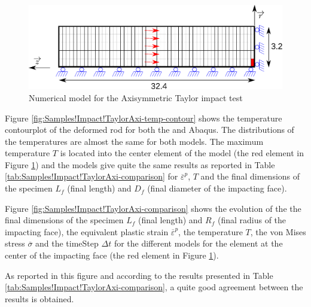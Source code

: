\begin{figure}[h]
\begin{centering}
\includegraphics[width=0.75\columnwidth]{Figures/TaylorAxi}
\par\end{centering}
\caption{Numerical model for the Axisymmetric Taylor impact test\label{fig:Samples!Impact!TaylorAxi}}
\end{figure}

Figure \ref{fig:Samples!Impact!TaylorAxi-temp-contour} shows the
temperature contourplot of the deformed rod for both the \DynELA and
Abaqus. The distributions of the temperatures are almost the same
for both models. The maximum temperature $T$ is located into the
center element of the model (the red element in Figure \ref{fig:Samples!Impact!TaylorAxi})
and the models give quite the same results as reported in Table \ref{tab:Samples!Impact!TaylorAxi-comparison}
for $\overline{\varepsilon}^{p}$, $T$ and the final dimensions of
the specimen $L_{f}$ (final length) and $D_{f}$ (final diameter
of the impacting face).

Figure \ref{fig:Samples!Impact!TaylorAxi-comparison} shows the evolution
of the the final dimensions of the specimen $L_{f}$ (final length)
and $R_{f}$ (final radius of the impacting face), the equivalent
plastic strain $\overline{\varepsilon}^{p}$, the temperature $T$,
the von Mises stress $\overline{\sigma}$ and the timeStep $\Delta t$
for the different models for the element at the center of the impacting
face (the red element in Figure \ref{fig:Samples!Impact!TaylorAxi}).

As reported in this figure and according to the results presented
in Table \ref{tab:Samples!Impact!TaylorAxi-comparison}, a quite good
agreement between the results is obtained.


